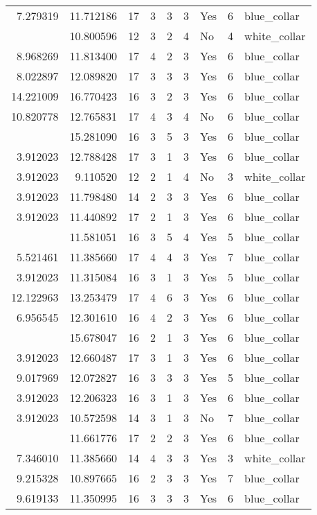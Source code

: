 \documentclass[
]{article}
\begin{document}
\begin{longtable}[t]{rrrrrllrl}
7.279319 & 11.712186 & 17 & 3 & 3 & 3 & Yes & 6 & blue\_collar\\
\addlinespace
8.787220 & 10.800596 & 12 & 3 & 2 & 4 & No & 4 & white\_collar\\
8.968269 & 11.813400 & 17 & 4 & 2 & 3 & Yes & 6 & blue\_collar\\
8.022897 & 12.089820 & 17 & 3 & 3 & 3 & Yes & 6 & blue\_collar\\
14.221009 & 16.770423 & 16 & 3 & 2 & 3 & Yes & 6 & blue\_collar\\
10.820778 & 12.765831 & 17 & 4 & 3 & 4 & No & 6 & blue\_collar\\
\addlinespace
10.779997 & 15.281090 & 16 & 3 & 5 & 3 & Yes & 6 & blue\_collar\\
3.912023 & 12.788428 & 17 & 3 & 1 & 3 & Yes & 6 & blue\_collar\\
3.912023 & 9.110520 & 12 & 2 & 1 & 4 & No & 3 & white\_collar\\
3.912023 & 11.798480 & 14 & 2 & 3 & 3 & Yes & 6 & blue\_collar\\
3.912023 & 11.440892 & 17 & 2 & 1 & 3 & Yes & 6 & blue\_collar\\
\addlinespace
10.492662 & 11.581051 & 16 & 3 & 5 & 4 & Yes & 5 & blue\_collar\\
5.521461 & 11.385660 & 17 & 4 & 4 & 3 & Yes & 7 & blue\_collar\\
3.912023 & 11.315084 & 16 & 3 & 1 & 3 & Yes & 5 & blue\_collar\\
12.122963 & 13.253479 & 17 & 4 & 6 & 3 & Yes & 6 & blue\_collar\\
6.956545 & 12.301610 & 16 & 4 & 2 & 3 & Yes & 6 & blue\_collar\\
\addlinespace
3.912023 & 15.678047 & 16 & 2 & 1 & 3 & Yes & 6 & blue\_collar\\
3.912023 & 12.660487 & 17 & 3 & 1 & 3 & Yes & 6 & blue\_collar\\
9.017969 & 12.072827 & 16 & 3 & 3 & 3 & Yes & 5 & blue\_collar\\
3.912023 & 12.206323 & 16 & 3 & 1 & 3 & Yes & 6 & blue\_collar\\
3.912023 & 10.572598 & 14 & 3 & 1 & 3 & No & 7 & blue\_collar\\
\addlinespace
8.306472 & 11.661776 & 17 & 2 & 2 & 3 & Yes & 6 & blue\_collar\\
7.346010 & 11.385660 & 14 & 4 & 3 & 3 & Yes & 3 & white\_collar\\
9.215328 & 10.897665 & 16 & 2 & 3 & 3 & Yes & 7 & blue\_collar\\
9.619133 & 11.350995 & 16 & 3 & 3 & 3 & Yes & 6 & blue\_collar\\

\end{longtable}
\end{document}
